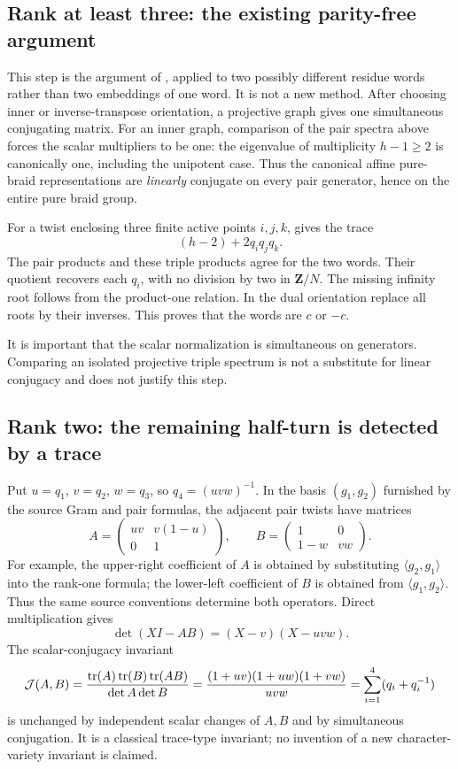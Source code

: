 \documentclass[11pt]{article}
\theoremstyle{remark}\newtheorem{remark}[theorem]{Remark}
\newcommand{\Z}{\mathbf Z}\newcommand{\PP}{\mathbf P}
\begin{document}
\subsection{Rank at least three: the existing parity-free argument}
This step is the argument of \cite[proof of Proposition 6.2]{MN}, applied
to two possibly different residue words rather than two embeddings of one
word. It is not a new method. After choosing inner or inverse-transpose
orientation, a projective graph gives one simultaneous conjugating matrix.
For an inner graph, comparison of the pair spectra above forces the scalar
multipliers to be one: the eigenvalue of multiplicity $h-1\geq2$ is
canonically one, including the unipotent case. Thus the canonical affine
pure-braid representations are \emph{linearly} conjugate on every pair
generator, hence on the entire pure braid group.

For a twist enclosing three finite active points $i,j,k$,
\cite[Theorem 2.8]{MN} gives the trace
\[
 (h-2)+2q_iq_jq_k.
\]
The pair products and these triple products agree for the two words.
Their quotient recovers each $q_i$, with no division by two in $\Z/N$.
The missing infinity root follows from the product-one relation. In the
dual orientation replace all roots by their inverses. This proves that
the words are $c$ or $-c$.

It is important that the scalar normalization is simultaneous on generators.
Comparing an isolated projective triple spectrum is not a substitute for
linear conjugacy and does not justify this step.

\subsection{Rank two: the remaining half-turn is detected by a trace}
Put $u=q_1$, $v=q_2$, $w=q_3$, so $q_4=(uvw)^{-1}$.
In the basis $(g_1,g_2)$ furnished by the source Gram and pair formulas,
the adjacent pair twists have matrices
\begin{equation}\label{eq:AB}
 A=\begin{pmatrix}uv&v(1-u)\\0&1\end{pmatrix},\qquad
 B=\begin{pmatrix}1&0\\1-w&vw\end{pmatrix}.
\end{equation}
For example, the upper-right coefficient of $A$ is obtained by substituting
$\langle g_2,g_1\rangle$ into the rank-one formula; the lower-left
coefficient of $B$ is obtained from $\langle g_1,g_2\rangle$.
Thus the same source conventions determine both operators. Direct
multiplication gives
\[
 \det(XI-AB)=(X-v)(X-uvw).
\]
The scalar-conjugacy invariant
\begin{equation}\label{eq:J}
 \mathcal J(A,B)=
 \frac{\operatorname{tr}(A)\operatorname{tr}(B)\operatorname{tr}(AB)}{\det A\det B}
 =\frac{(1+uv)(1+uw)(1+vw)}{uvw}
 =\sum_{i=1}^4(q_i+q_i^{-1})
\end{equation}
is unchanged by independent scalar changes of $A,B$ and by simultaneous
conjugation. It is a classical trace-type invariant; no invention of a new
character-variety invariant is claimed.
\end{document}
